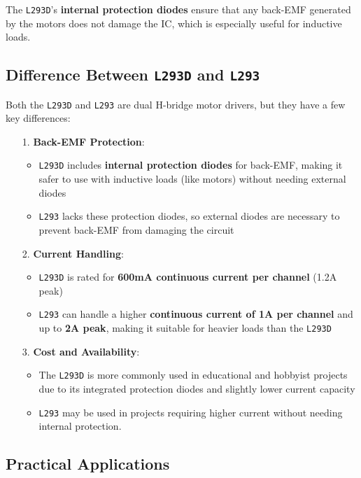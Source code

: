 \documentclass[a4paper,12pt]{article}
\begin{document}
The \texttt{L293D}'s \textbf{internal protection diodes} ensure that any back-EMF generated by the motors does not damage the IC, which is especially useful for inductive loads.

\subsection{Difference Between \texttt{L293D} and \texttt{L293}}
Both the \texttt{L293D} and \texttt{L293} are dual H-bridge motor drivers, but they have a few key differences:

\begin{itemize}
    \item[1.] \textbf{Back-EMF Protection}:
    \begin{itemize}
        \item \texttt{L293D} includes \textbf{internal protection diodes} for back-EMF, making it safer to use with inductive loads (like motors) without needing external diodes
        \item \texttt{L293} lacks these protection diodes, so external diodes are necessary to prevent back-EMF from damaging the circuit
    \end{itemize}
    \item[2.] \textbf{Current Handling}:
    \begin{itemize}
        \item \texttt{L293D} is rated for \textbf{600mA continuous current per channel} (1.2A peak)
        \item \texttt{L293} can handle a higher \textbf{continuous current of 1A per channel} and up to \textbf{2A peak}, making it suitable for heavier loads than the \texttt{L293D}
    \end{itemize}
    \item[3.] \textbf{Cost and Availability}:
    \begin{itemize}
        \item The \texttt{L293D} is more commonly used in educational and hobbyist projects due to its integrated protection diodes and slightly lower current capacity
        \item \texttt{L293} may be used in projects requiring higher current without needing internal protection.
    \end{itemize}
\end{itemize}

\subsection{Practical Applications}
\end{document}

